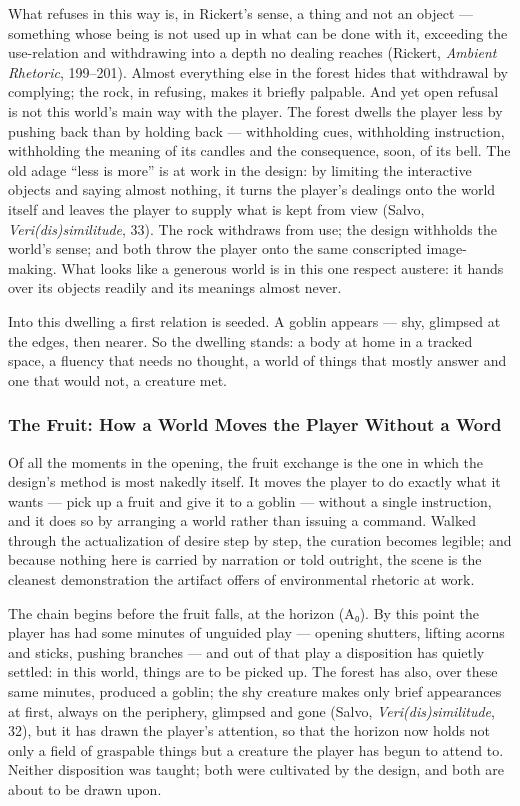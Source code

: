 What refuses in this way is, in Rickert's sense, a thing and not an object — something whose being is not used up in what can be done with it, exceeding the use-relation and withdrawing into a depth no dealing reaches (Rickert, \textit{Ambient Rhetoric}, 199–201). Almost everything else in the forest hides that withdrawal by complying; the rock, in refusing, makes it briefly palpable. And yet open refusal is not this world's main way with the player. The forest dwells the player less by pushing back than by holding back — withholding cues, withholding instruction, withholding the meaning of its candles and the consequence, soon, of its bell. The old adage ``less is more'' is at work in the design: by limiting the interactive objects and saying almost nothing, it turns the player's dealings onto the world itself and leaves the player to supply what is kept from view (Salvo, \textit{Veri(dis)similitude}, 33). The rock withdraws from use; the design withholds the world's sense; and both throw the player onto the same conscripted image-making. What looks like a generous world is in this one respect austere: it hands over its objects readily and its meanings almost never.

Into this dwelling a first relation is seeded. A goblin appears — shy, glimpsed at the edges, then nearer. So the dwelling stands: a body at home in a tracked space, a fluency that needs no thought, a world of things that mostly answer and one that would not, a creature met.

\subsubsection*{The Fruit: How a World Moves the Player Without a Word}

Of all the moments in the opening, the fruit exchange is the one in which the design's method is most nakedly itself. It moves the player to do exactly what it wants — pick up a fruit and give it to a goblin — without a single instruction, and it does so by arranging a world rather than issuing a command. Walked through the actualization of desire step by step, the curation becomes legible; and because nothing here is carried by narration or told outright, the scene is the cleanest demonstration the artifact offers of environmental rhetoric at work.

The chain begins before the fruit falls, at the horizon (A₀). By this point the player has had some minutes of unguided play — opening shutters, lifting acorns and sticks, pushing branches — and out of that play a disposition has quietly settled: in this world, things are to be picked up. The forest has also, over these same minutes, produced a goblin; the shy creature makes only brief appearances at first, always on the periphery, glimpsed and gone (Salvo, \textit{Veri(dis)similitude}, 32), but it has drawn the player's attention, so that the horizon now holds not only a field of graspable things but a creature the player has begun to attend to. Neither disposition was taught; both were cultivated by the design, and both are about to be drawn upon.


